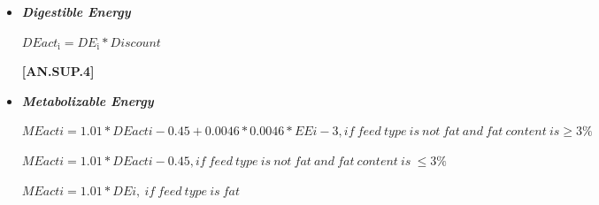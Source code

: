 \begin{refsection}
\begin{itemize}
    \begin{center}
    \(Discount = 1, if TDNconc < 60 \frac{(TDNconc - (0.18 * TDNconc - 10.3) * (DMI_{\text{to,maint}} - 1))}{TDNconc}\)
    \end{center}
    \vspace{0.5cm}
    
            {\raggedleft \textbf{[AN.SUP.3.1]}\par}
            \vspace{0.5cm}

    \begin{center}
    \(TDNact_{\text{i}} = TDN_{\text{i}} * Discount\)
    \end{center}
    \vspace{0.5cm}
    
            {\raggedleft \textbf{[AN.SUP.4.1]}\par}
            \vspace{0.5cm}

    \item \textbf{\textit{Digestible Energy}} 
    \vspace{0.25cm}

    \begin{center}
    \(DEact_{\text{i}} = DE_{\text{i}} * Discount\)
    \end{center}
    \vspace{0.5cm}
    
            {\raggedleft \textbf{[AN.SUP.4]}\par}
            \vspace{0.5cm}

    \item \textbf{\textit{Metabolizable Energy}} 
    \vspace{0.25cm}

    \begin{center}
    \(MEacti = 1.01 * DEacti - 0.45 + 0.0046 * 0.0046 * EEi - 3, if\ feed\ type\ is\ not\ fat\ and\ fat\ content\ is \geq 3\%\)
    \end{center}
    \vspace{0.5cm}

    \begin{center}
    \(MEacti = 1.01 * DEacti - 0.45, if\ feed\ type\ is\ not\ fat\ and\ fat\ content\ is\ \leq 3\%\)
    \end{center}
    \vspace{0.5cm}

    \begin{center}
    \(MEacti = 1.01 * DEi,\ if\ feed\ type\ is\ fat\)
    \end{center}
    \vspace{0.5cm}
    

\end{itemize}
\end{refsection}
